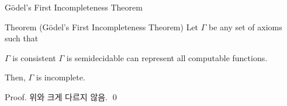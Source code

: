 \documentclass[../231120_msquare_computational-logic.tex]{subfiles}
\begin{document}
\begin{frame}{Gödel's First Incompleteness Theorem}
    \begin{block}{Theorem (Gödel's First Incompleteness Theorem)}
        Let \(\Gamma\) be any set of axioms such that
        \begin{itemize}
            \ii \(\Gamma\) is consistent
            \ii \(\Gamma\) is semidecidable
            \ii can represent all computable functions.
        \end{itemize}
        Then, \(\Gamma\) is incomplete.
    \end{block}
    \begin{block}{Proof.}
        위와 크게 다르지 않음. \qed
    \end{block}
\end{frame}
\end{document}
